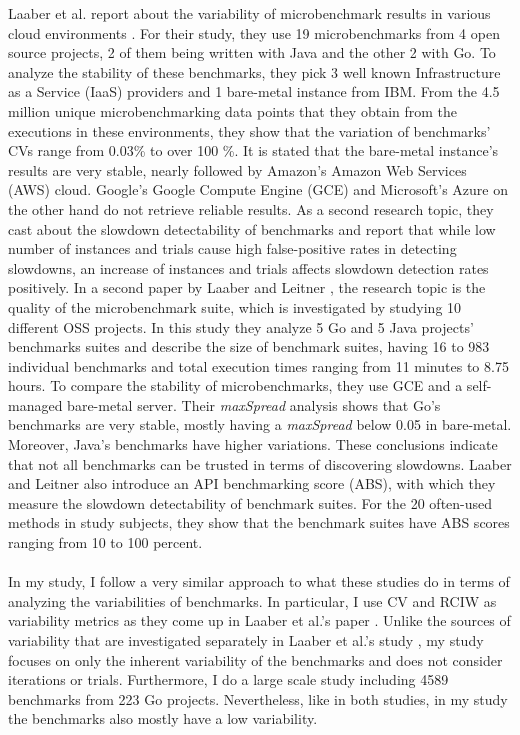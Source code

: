 \documentclass{seal_thesis}
\begin{document}
Laaber et al. report about the variability of microbenchmark results in various cloud environments \cite{laaber2019software}. For their study, they use 19 microbenchmarks from 4 open source projects, 2 of them being written with Java and the other 2 with Go. To analyze the stability of these benchmarks, they pick 3 well known Infrastructure as a Service (IaaS) providers and 1 bare-metal instance from IBM. From the 4.5 million unique microbenchmarking data points that they obtain from the executions in these environments, they show that the variation of benchmarks' CVs range from 0.03\% to over 100 \%. It is stated that the bare-metal instance's results are very stable, nearly followed by Amazon's Amazon Web Services (AWS) cloud. Google's Google Compute Engine (GCE) and Microsoft's Azure on the other hand do not retrieve reliable results. As a second research topic, they cast about the slowdown detectability of benchmarks and report that while low number of instances and trials cause high false-positive rates in detecting slowdowns, an increase of instances and trials affects slowdown detection rates positively. In a second paper by Laaber and Leitner \cite{Laaber:2018:EOS:3196398.3196407}, the research topic is the quality of the microbenchmark suite, which is investigated by studying 10 different OSS projects. In this study they analyze 5 Go and 5 Java projects' benchmarks suites and describe the size of benchmark suites, having 16 to 983 individual benchmarks and total execution times ranging from 11 minutes to 8.75 hours. To compare the stability of microbenchmarks, they use GCE and a self-managed bare-metal server. Their \textit{maxSpread} analysis shows that Go's benchmarks are very stable, mostly having a \textit{maxSpread} below 0.05 in bare-metal. Moreover, Java's benchmarks have higher variations. These conclusions indicate that not all benchmarks can be trusted in terms of discovering slowdowns. Laaber and Leitner also introduce an API benchmarking score (ABS), with which they measure the slowdown detectability of benchmark suites. For the 20 often-used methods in study subjects, they show that the benchmark suites have ABS scores ranging from 10 to 100 percent.\\
\\
In my study, I follow a very similar approach to what these studies do in terms of analyzing the variabilities of benchmarks. In particular, I use CV and RCIW as variability metrics as they come up in Laaber et al.'s paper \cite{laaber2019software}. Unlike the sources of variability that are investigated separately in Laaber et al.'s study \cite{laaber2019software}, my study focuses on only the inherent variability of the benchmarks and does not consider iterations or trials. Furthermore, I do a large scale study including 4589 benchmarks from 223 Go projects. Nevertheless, like in both studies, in my study the benchmarks also mostly have a low variability.\\
\end{document}
